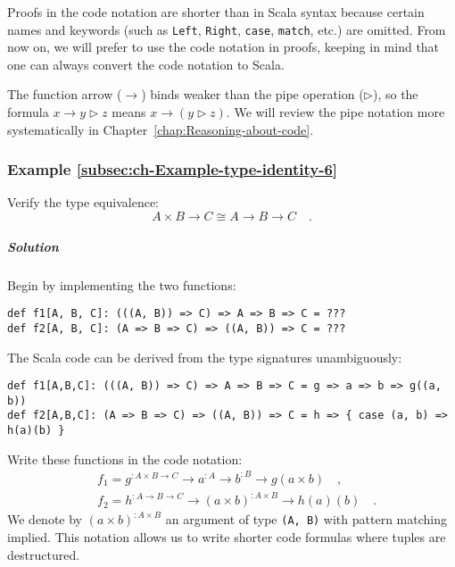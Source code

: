 Proofs in the code notation are shorter than in Scala syntax because
certain names and keywords (such as \lstinline!Left!, \lstinline!Right!,
\lstinline!case!, \lstinline!match!, etc.) are omitted. From now
on, we will prefer to use the code notation in proofs, keeping in
mind that one can always convert the code notation to Scala.

The function arrow ($\rightarrow$) binds weaker than the pipe
operation ($\triangleright$), so the formula $x\rightarrow y\triangleright z$
means $x\rightarrow(y\triangleright z)$. We will review the pipe
notation more systematically in Chapter~\ref{chap:Reasoning-about-code}.

\subsubsection{Example \label{subsec:ch-Example-type-identity-6}\ref{subsec:ch-Example-type-identity-6}}

Verify the type equivalence:
\[
A\times B\rightarrow C\cong A\rightarrow B\rightarrow C\quad.
\]


\subparagraph{Solution}

Begin by implementing the two functions:
\begin{lstlisting}
def f1[A, B, C]: (((A, B)) => C) => A => B => C = ???
def f2[A, B, C]: (A => B => C) => ((A, B)) => C = ???
\end{lstlisting}
The Scala code can be derived from the type signatures unambiguously:
\begin{lstlisting}
def f1[A,B,C]: (((A, B)) => C) => A => B => C = g => a => b => g((a, b))
def f2[A,B,C]: (A => B => C) => ((A, B)) => C = h => { case (a, b) => h(a)(b) }
\end{lstlisting}
Write these functions in the code notation:
\begin{align*}
 & f_{1}=g^{:A\times B\rightarrow C}\rightarrow a^{:A}\rightarrow b^{:B}\rightarrow g(a\times b)\quad,\\
 & f_{2}=h^{:A\rightarrow B\rightarrow C}\rightarrow\left(a\times b\right)^{:A\times B}\rightarrow h(a)(b)\quad.
\end{align*}
We denote by $\left(a\times b\right)^{:A\times B}$ an argument of
type \lstinline!(A, B)! with pattern matching implied. This notation
allows us to write shorter code formulas where tuples are destructured.

